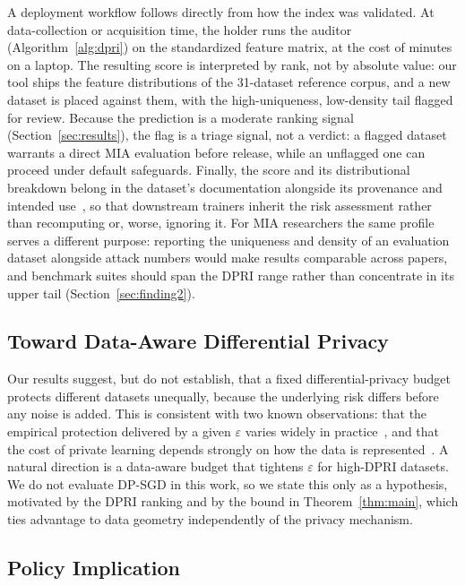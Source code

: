A deployment workflow follows directly from how the index was
validated. At data-collection or acquisition time, the holder runs the
auditor (Algorithm~\ref{alg:dpri}) on the standardized feature matrix,
at the cost of minutes on a laptop. The resulting score is interpreted
by rank, not by absolute value: our tool ships the feature distributions
of the 31-dataset reference corpus, and a new dataset is placed against
them, with the high-uniqueness, low-density tail flagged for review.
Because the prediction is a moderate ranking signal
(Section~\ref{sec:results}), the flag is a triage signal, not a
verdict: a flagged dataset warrants a direct MIA evaluation before
release, while an unflagged one can proceed under default safeguards.
Finally, the score and its distributional breakdown belong in the
dataset's documentation alongside its provenance and intended
use~\cite{gebru2021datasheets}, so that downstream trainers inherit the
risk assessment rather than recomputing or, worse, ignoring it. For MIA
researchers the same profile serves a different purpose: reporting the
uniqueness and density of an evaluation dataset alongside attack
numbers would make results comparable across papers, and benchmark
suites should span the DPRI range rather than concentrate in its upper
tail (Section~\ref{sec:finding2}).

\subsection{Toward Data-Aware Differential Privacy}

Our results suggest, but do not establish, that a fixed differential-privacy
budget protects different datasets unequally, because the underlying risk
differs before any noise is added. This is consistent with two known
observations: that the empirical protection delivered by a given
$\varepsilon$ varies widely in practice~\cite{jayaraman2019evaluating},
and that the cost of private learning depends strongly on how the data is
represented~\cite{tramer2021differentially}. A natural direction is a
data-aware budget that tightens $\varepsilon$ for high-DPRI datasets. We
do not evaluate DP-SGD in this work, so we state this only as a
hypothesis, motivated by the DPRI ranking and by the bound in
Theorem~\ref{thm:main}, which ties advantage to data geometry
independently of the privacy mechanism.

\subsection{Policy Implication}

